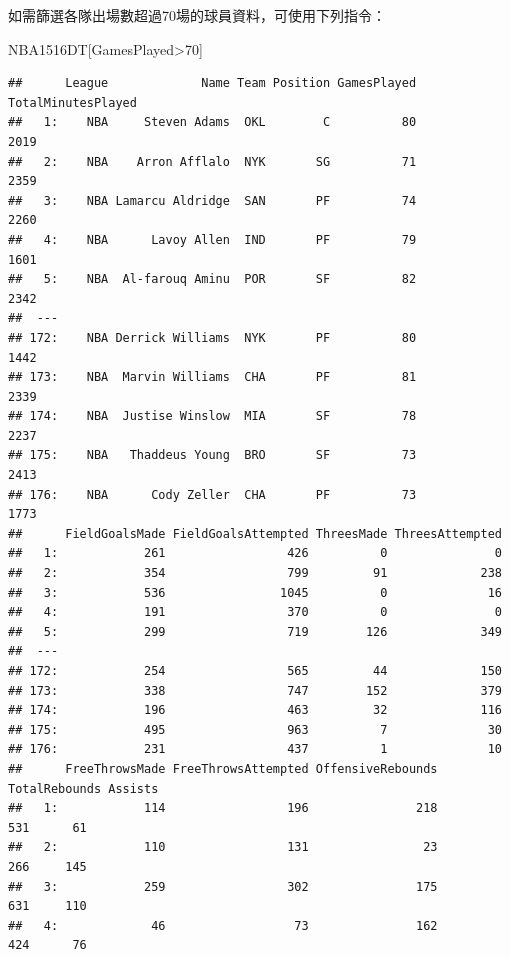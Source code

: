 \documentclass[]{book}
\newenvironment{Shaded}{\begin{snugshade}}{\end{snugshade}}
\newcommand{\DecValTok}[1]{\textcolor[rgb]{0.00,0.00,0.81}{{#1}}}
\newcommand{\NormalTok}[1]{{#1}}
\theoremstyle{definition}
\theoremstyle{definition}
\theoremstyle{remark}
\begin{document}
如需篩選各隊出場數超過70場的球員資料，可使用下列指令：

\begin{Shaded}
\begin{Highlighting}[]
\NormalTok{NBA1516DT[GamesPlayed>}\DecValTok{70}\NormalTok{]}
\end{Highlighting}
\end{Shaded}

\begin{verbatim}
##      League             Name Team Position GamesPlayed TotalMinutesPlayed
##   1:    NBA     Steven Adams  OKL        C          80               2019
##   2:    NBA    Arron Afflalo  NYK       SG          71               2359
##   3:    NBA Lamarcu Aldridge  SAN       PF          74               2260
##   4:    NBA      Lavoy Allen  IND       PF          79               1601
##   5:    NBA  Al-farouq Aminu  POR       SF          82               2342
##  ---                                                                     
## 172:    NBA Derrick Williams  NYK       PF          80               1442
## 173:    NBA  Marvin Williams  CHA       PF          81               2339
## 174:    NBA  Justise Winslow  MIA       SF          78               2237
## 175:    NBA   Thaddeus Young  BRO       SF          73               2413
## 176:    NBA      Cody Zeller  CHA       PF          73               1773
##      FieldGoalsMade FieldGoalsAttempted ThreesMade ThreesAttempted
##   1:            261                 426          0               0
##   2:            354                 799         91             238
##   3:            536                1045          0              16
##   4:            191                 370          0               0
##   5:            299                 719        126             349
##  ---                                                              
## 172:            254                 565         44             150
## 173:            338                 747        152             379
## 174:            196                 463         32             116
## 175:            495                 963          7              30
## 176:            231                 437          1              10
##      FreeThrowsMade FreeThrowsAttempted OffensiveRebounds TotalRebounds Assists
##   1:            114                 196               218           531      61
##   2:            110                 131                23           266     145
##   3:            259                 302               175           631     110
##   4:             46                  73               162           424      76

\end{verbatim}
\end{document}
